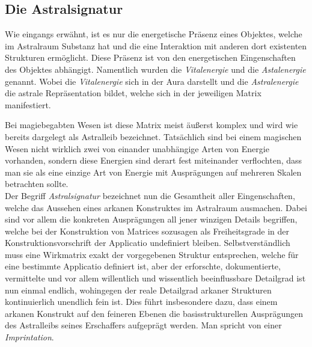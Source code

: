 \documentclass[a5paper,8pt]{book}
\begin{document}
\subsection{Die Astralsignatur}
\begin{multicols}{2}
Wie eingangs erwähnt, ist es nur die energetische Präsenz eines Objektes, welche im Astralraum Substanz hat und die eine
Interaktion mit anderen dort existenten Strukturen ermöglicht. Diese Präsenz ist von den energetischen Eingenschaften
des Objektes abhängigt. Namentlich wurden die \textit{Vitalenergie} und die \textit{Astalenergie} genannt. Wobei die
\textit{Vitalenergie} sich in der Aura darstellt und die \textit{Astralenergie} die astrale Repräsentation bildet, welche
sich in der jeweiligen Matrix manifestiert. 

Bei magiebegabten Wesen ist diese Matrix meist äußerst komplex und wird wie bereits dargelegt als Astralleib
bezeichnet. Tatsächlich sind bei einem magischen Wesen nicht wirklich zwei von einander unabhängige Arten von
Energie vorhanden, sondern diese Energien sind derart fest miteinander verflochten, dass man sie
als eine einzige Art von Energie mit Ausprägungen auf mehreren Skalen betrachten sollte.\\


Der Begriff \textit{Astralsignatur} bezeichnet nun die Gesamtheit aller Eingenschaften, welche das
Aussehen \footnotemark[3]
eines arkanen Konstruktes im Astralraum ausmachen. Dabei sind vor allem die konkreten Ausprägungen all jener winzigen
Details begriffen, welche bei der Konstruktion von Matrices sozusagen als Freiheitsgrade in der
Konstruktionsvorschrift der Applicatio undefiniert bleiben. Selbstverständlich muss eine Wirkmatrix exakt der vorgegebenen Struktur
entsprechen, welche für eine bestimmte Applicatio definiert ist, aber der erforschte, dokumentierte, vermittelte und vor allem
willentlich und wissentlich beeinflussbare Detailgrad ist nun einmal endlich, wohingegen der reale Detailgrad arkaner
Strukturen kontinuierlich unendlich fein ist. Dies führt insbesondere dazu, dass einem arkanen Konstrukt auf den
feineren Ebenen die basisstrukturellen Ausprägungen des Astralleibs seines Erschaffers aufgeprägt werden. Man spricht
von einer \textit{Imprintation}.


\end{multicols}
\end{document}
